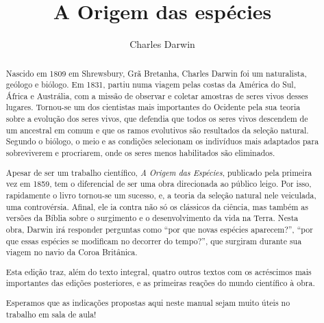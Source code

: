 \documentclass[11pt]{extarticle}
\begin{document}
\newcommand{\AutorLivro}{Charles Darwin}
\newcommand{\TituloLivro}{A Origem das espécies}
\newcommand{\Tema}{História da ciência}
\newcommand{\Genero}{Tratado científico}
\newcommand{\imagemCapa}{./images/PNLD0060-01.png}
\newcommand{\issnppub}{---}
\newcommand{\issnepub}{---}
\newcommand{\colaborador}{\textbf{Vicente Castro e Bruno Gradella}}


\title{\TituloLivro}
\author{\AutorLivro}
\def\authornotes{\colaborador}

\date{}
\maketitle






\begin{abstract} 

Nascido em 1809 em Shrewsbury, Grã Bretanha, Charles Darwin foi um naturalista,
geólogo e biólogo. Em 1831, partiu numa viagem pelas costas da América do Sul,
África e Austrália, com a missão de observar e coletar amostras de seres vivos
desses lugares. Tornou-se um dos cientistas mais importantes do Ocidente pela
sua teoria sobre a evolução dos seres vivos, que defendia que todos os seres
vivos descendem de um ancestral em comum e que os ramos evolutivos são
resultados da seleção natural. Segundo o biólogo, o meio e as condições
selecionam os indivíduos mais adaptados para sobreviverem e procriarem, onde os
seres menos habilitados são eliminados.

Apesar de ser um trabalho científico, \emph{A Origem das Espécies}, publicado
pela primeira vez em 1859, tem o diferencial de ser uma obra direcionada ao
público leigo.  Por isso, rapidamente o livro tornou-se um sucesso, e, a teoria
da seleção natural nele veiculada, uma controvérsia. Afinal, ele ia contra não
só os clássicos da ciência, mas também as versões da Bíblia sobre o surgimento
e o desenvolvimento da vida na Terra.  Nesta obra, Darwin irá responder
perguntas como ``por que novas espécies aparecem?'', ``por que essas espécies se
modificam no decorrer do tempo?'', que surgiram durante sua viagem no navio da
Coroa Britânica. 

Esta edição traz, além do texto integral, quatro outros textos com os
acréscimos mais importantes das edições posteriores, e as primeiras reações do
mundo científico à obra. 

Esperamos que as indicações propostas aqui neste manual sejam muito úteis no
trabalho em sala de aula!

\end{abstract}
\end{document}
